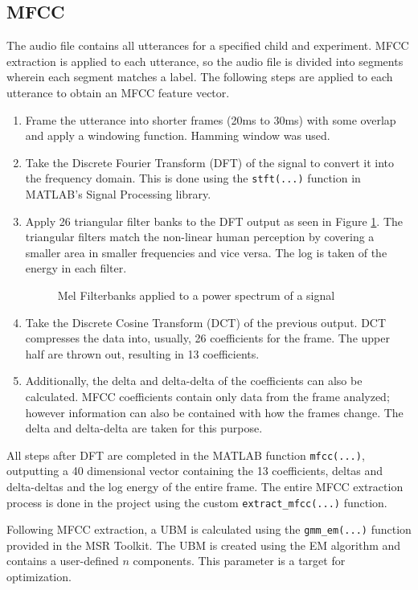 \subsection{MFCC}
	The audio file contains all utterances for a specified child and experiment. MFCC extraction is applied to each utterance, so the audio file is divided into segments wherein each segment matches a label. The following steps are applied to each utterance to obtain an MFCC feature vector.
	\begin{enumerate}
		\item Frame the utterance into shorter frames (20ms to 30ms) with some overlap and apply a windowing function. Hamming window was used.
		\item Take the Discrete Fourier Transform (DFT)  of the signal to convert it into the frequency domain. This is done using the \verb|stft(...)| function in MATLAB's Signal Processing library.
		\item Apply 26 triangular filter banks to the DFT output as seen in Figure \ref{fig:filterbanks}. The triangular filters match the non-linear human perception by covering a smaller area in smaller frequencies and vice versa. The log is taken of the energy in each filter.
					\begin{figure}[!htb]
			\caption{\label{fig:filterbanks} Mel Filterbanks applied to a power spectrum of a signal}
		\end{figure}
		\item Take the Discrete Cosine Transform (DCT) of the previous output. DCT compresses the data into, usually, 26 coefficients for the frame. The upper half are thrown out, resulting in 13 coefficients.
		\item Additionally, the delta and delta-delta of the coefficients can also be calculated. MFCC coefficients contain only data from the frame analyzed; however information can also be contained with how the frames change. The delta and delta-delta are taken for this purpose.
	\end{enumerate}

	All steps after DFT are completed in the MATLAB function \verb|mfcc(...)|, outputting a 40 dimensional vector containing the 13 coefficients, deltas and delta-deltas and the log energy of the entire frame. The entire MFCC extraction process is done in the project using the custom \verb|extract_mfcc(...)| function.
	
	Following MFCC extraction, a UBM is calculated using the \verb|gmm_em(...)| function provided in the MSR Toolkit. The UBM is created using the EM algorithm and contains a user-defined $n$ components. This parameter is a target for optimization.

